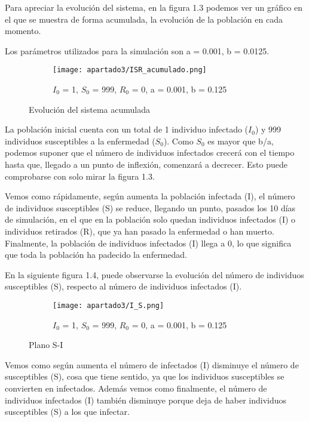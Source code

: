 Para apreciar la evolución del sistema, en la figura 1.3 podemos ver un gráfico en el que se muestra de forma acumulada, la evolución de la población en cada momento.

Los parámetros utilizados para la simulación son a = 0.001, b = 0.0125.

\begin{figure}[H]
	\centering
	\begin{subfigure}[b]{0.8\textwidth}
		\centering
		\texttt{[image: apartado3/ISR\_acumulado.png]}
		\caption{$I_0$ = 1, $S_0$ = 999, $R_0$ = 0, a = 0.001, b = 0.125}
	\end{subfigure}
	\caption{Evolución del sistema acumulada}
\end{figure}

La población inicial cuenta con un total de 1 individuo infectado ($I_0$) y 999 individuos susceptibles a la enfermedad ($S_0$). Como $S_0$ es mayor que b/a, podemos suponer que el número de individuos infectados crecerá con el tiempo hasta que, llegado a un punto de inflexión, comenzará a decrecer. Esto puede comprobarse con solo mirar la figura 1.3.

Vemos como rápidamente, según aumenta la población infectada (I), el número de individuos susceptibles (S) se reduce, llegando un punto, pasados los 10 días de simulación, en el que en la población solo quedan individuos infectados (I) o individuos retirados (R), que ya han pasado la enfermedad o han muerto. Finalmente, la población de individuos infectados (I) llega a 0, lo que significa que toda la población ha padecido la enfermedad.

\newpage

En la siguiente figura 1.4, puede observarse la evolución del número de individuos susceptibles (S), respecto al número de individuos infectados (I).

\begin{figure}[H]
	\centering
	\begin{subfigure}[b]{0.8\textwidth}
		\centering
		\texttt{[image: apartado3/I\_S.png]}
		\caption{$I_0$ = 1, $S_0$ = 999, $R_0$ = 0, a = 0.001, b = 0.125}
	\end{subfigure}
	\caption{Plano S-I}
\end{figure}

Vemos como según aumenta el número de infectados (I) disminuye el número de susceptibles (S), cosa que tiene sentido, ya que los individuos susceptibles se convierten en infectados. Además vemos como finalmente, el número de individuos infectados (I) también disminuye porque deja de haber individuos susceptibles (S) a los que infectar.

